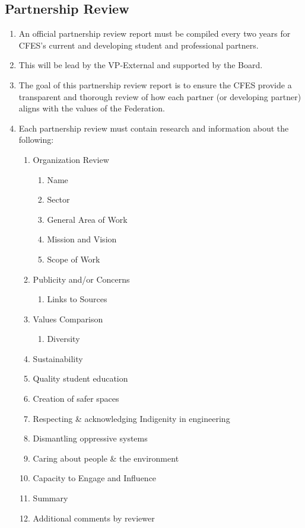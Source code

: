 \subsection{Partnership Review}
\label{partnership-review}

\begin{enumerate}
 \item
  An official partnership review report must be compiled every two years for CFES's current and developing student and professional partners.
 \item
  This will be lead by the VP-External and supported by the Board.
 \item
  The goal of this partnership review report is to ensure the CFES provide a transparent and thorough review of how each partner (or developing partner) aligns with the values of the Federation.
 \item
  Each partnership review must contain research and information about the following:

  \begin{enumerate}
   \item
    Organization Review

    \begin{enumerate}
     \item
      Name
     \item
      Sector
     \item
      General Area of Work
     \item
      Mission and Vision
     \item
      Scope of Work
    \end{enumerate}
   \item
    Publicity and/or Concerns

    \begin{enumerate}
     \item
      Links to Sources
    \end{enumerate}
   \item
    Values Comparison

    \begin{enumerate}
     \item
      Diversity
    \end{enumerate}
   \item
    Sustainability
   \item
    Quality student education
   \item
    Creation of safer spaces
   \item
    Respecting \& acknowledging Indigenity in engineering
   \item
    Dismantling oppressive systems
   \item
    Caring about people \& the environment
   \item
    Capacity to Engage and Influence
   \item
    Summary
   \item
    Additional comments by reviewer
  \end{enumerate}
\end{enumerate}

